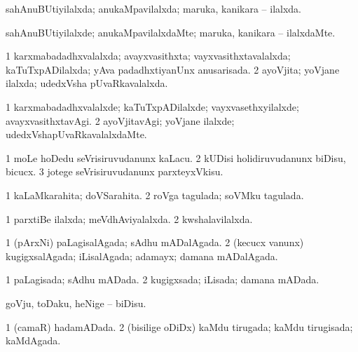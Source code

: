 \bentry
{} 
\gl{\gu}
\expl{}
\bmng
sahAnuBUtiyilalxda; anukaMpavilalxda; maruka, kanikara -- ilalxda. 
\emng
\eentry

\bentry
{} 
\gl{\kirxvi}
\expl{}
\bmng
sahAnuBUtiyilalxde; anukaMpavilalxdaMte; maruka, kanikara -- ilalxdaMte. 
\emng
\eentry

\bentry
{} 
\gl{\gu}
\expl{}
\bmng
\bnum
\num{1} karxmabadadhxvalalxda; avayxvasithxta; vayxvasithxtavalalxda; kaTuTxpADilalxda; yAva padadhxtiyanUnx anusarisada. 
\num{2} ayoVjita; yoVjane ilalxda; udedxVsha pUvaRkavalalxda. 
\enum
\emng
\eentry

\bentry
{} 
\gl{\kirxvi}
\bmng
\bnum
\num{1} karxmabadadhxvalalxde; kaTuTxpADilalxde; vayxvasethxyilalxde; avayxvasithxtavAgi. 
\num{2} ayoVjitavAgi; yoVjane ilalxde; udedxVshapUvaRkavalalxdaMte. 
\enum
\emng
\eentry

\bentry
{} 
\gl{\sakirx}
\expl{}
\bmng
\bnum
\num{1} moLe hoDedu seVrisiruvudanunx kaLacu. 
\num{2} kUDisi holidiruvudanunx biDisu, bicucx. 
\num{3} jotege seVrisiruvudanunx parxteyxVkisu. 
\enum
\emng
\eentry

\bentry
{} 
\gl{\gu}
\expl{}
\bmng
\bnum
\num{1} kaLaMkarahita; doVSarahita. 
\num{2} roVga tagulada; soVMku tagulada. 
\enum
\emng
\eentry

\bentry
{} 
\gl{\gu}
\expl{}
\bmng
\bnum
\num{1} parxtiBe ilalxda; meVdhAviyalalxda. 
\num{2} kwshalavilalxda. 
\enum
\emng
\eentry

\bentry
{} 
\gl{\gu}
\expl{}
\bmng
\bnum
\num{1} (pArxNi) paLagisalAgada; sAdhu mADalAgada. 
\num{2} (kecucx \mo vanunx) kugigxsalAgada; iLisalAgada; adamayx; damana mADalAgada. 
\enum
\emng
\eentry

\bentry
{} 
\gl{\gu}
\expl{}
\bmng
\bnum
\num{1} paLagisada; sAdhu mADada. 
\num{2} kugigxsada; iLisada; damana mADada. 
\enum
\emng
\eentry

\bentry
{} 
\gl{\sakirx}
\expl{}
\bmng
goVju, toDaku, heNige -- biDisu. 
\emng
\eentry

\bentry
{} 
\gl{\gu}
\expl{}
\bmng
\bnum
\num{1} (camaR) hadamADada. 
\num{2} (bisilige oDiDx) kaMdu tirugada; kaMdu tirugisada; kaMdAgada. 
\enum
\emng
\eentry

